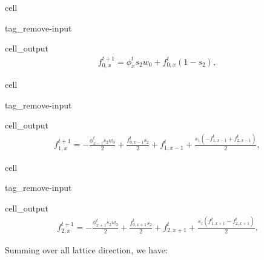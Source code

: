 \documentclass[letterpaper,10pt,english,openany,oneside]{jupyterBook}
\begin{document}
\begin{sphinxuseclass}{cell}
\begin{sphinxuseclass}{tag_remove-input}\begin{sphinxVerbatimOutput}

\begin{sphinxuseclass}{cell_output}\begin{equation*}
\begin{split}\displaystyle f_{0,x}^{t+1} = \phi^{t}_{x} s_{2} w_{0} + f_{0,x}^{t} \left(1 - s_{2}\right),\end{split}
\end{equation*}
\end{sphinxuseclass}\end{sphinxVerbatimOutput}

\end{sphinxuseclass}
\end{sphinxuseclass}
\begin{sphinxuseclass}{cell}
\begin{sphinxuseclass}{tag_remove-input}\begin{sphinxVerbatimOutput}

\begin{sphinxuseclass}{cell_output}\begin{equation*}
\begin{split}\displaystyle f_{1,x}^{t+1} = - \frac{\phi_{x-1}^t s_{2} w_{0}}{2} + \frac{f_{0,x-1}^{t} s_{2}}{2} + f_{1,x-1}^{t} + \frac{s_{1} \left(- f_{1,x-1}^{t} + f_{2,x-1}^{t}\right)}{2},\end{split}
\end{equation*}
\end{sphinxuseclass}\end{sphinxVerbatimOutput}

\end{sphinxuseclass}
\end{sphinxuseclass}
\begin{sphinxuseclass}{cell}
\begin{sphinxuseclass}{tag_remove-input}\begin{sphinxVerbatimOutput}

\begin{sphinxuseclass}{cell_output}\begin{equation*}
\begin{split}\displaystyle f_{2,x}^{t+1} = - \frac{\phi_{x+1}^t s_{2} w_{0}}{2} + \frac{f_{0,x+1}^{t} s_{2}}{2} + f_{2,x+1}^{t} + \frac{s_{1} \left(f_{1,x+1}^{t} - f_{2,x+1}^{t}\right)}{2}.\end{split}
\end{equation*}
\end{sphinxuseclass}\end{sphinxVerbatimOutput}

\end{sphinxuseclass}
\end{sphinxuseclass}
\sphinxAtStartPar
Summing over all lattice direction, we have:
\end{document}

